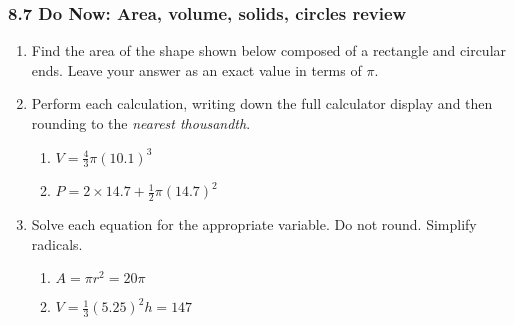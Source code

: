 \documentclass[12pt, twoside]{article}
\begin{document}
\subsubsection*{8.7 Do Now: Area, volume, solids, circles review}
 \begin{enumerate}

  \item Find the area of the shape shown below composed of a rectangle and circular ends. Leave your answer as an exact value in terms of $\pi$.
  \begin{flushright}
\end{flushright}\vspace{1cm}

\item Perform each calculation, writing down the full calculator display and then rounding to the \emph{nearest thousandth}.
\begin{multicols}{2}
\begin{enumerate}[itemsep=2cm]
  \item $V=\frac{4}{3} \pi (10.1)^3$
  \item $P=2 \times 14.7 + \frac{1}{2} \pi (14.7)^2$  
\end{enumerate}
\end{multicols}\vspace{3cm}

\item Solve each equation for the appropriate variable. Do not round. Simplify radicals.
\begin{multicols}{2}
\begin{enumerate}[itemsep=2cm]
  \item $A=\pi r^2=20\pi$
  \item $V=\frac{1}{3}(5.25)^2h=147$  
\end{enumerate}
\end{multicols}\vspace{2cm}

\newpage

\end{enumerate}
\end{document}
